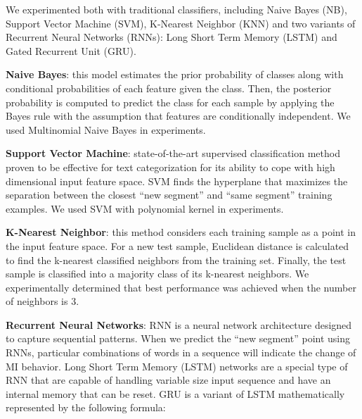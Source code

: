 \documentclass{amia}
\begin{document}
We experimented both with traditional classifiers, including Naive Bayes (NB)\cite{pedregosa2011scikit}, Support Vector Machine (SVM)\cite{chang2011libsvm}, K-Nearest Neighbor (KNN)\cite{pedregosa2011scikit} and two variants of Recurrent Neural Networks (RNNs)\cite{bengio1993problem}: Long Short Term Memory (LSTM)\cite{hochreiter1997long} and Gated Recurrent Unit (GRU)\cite{cho2014properties}. 

\textbf{Naive Bayes}: this model estimates the prior probability of classes along with conditional probabilities of each feature given the class. Then, the posterior probability is computed to predict the class for each sample by applying the Bayes rule with the assumption that features are conditionally independent. We used Multinomial Naive Bayes in experiments.

\textbf{Support Vector Machine}: state-of-the-art supervised classification method proven to be effective for text categorization\cite{joachims1998text} for its ability to cope with high dimensional input feature space. SVM finds the hyperplane that maximizes the separation between the closest ``new segment'' and ``same segment'' training examples. We used SVM with polynomial kernel in experiments.   

\textbf{K-Nearest Neighbor}: this method considers each training sample as a point in the input feature space. For a new test sample, Euclidean distance is calculated to find the k-nearest classified neighbors from the training set. Finally, the test sample is classified into a majority class of its k-nearest neighbors. We experimentally determined that best performance was achieved when the number of neighbors is 3. 

\textbf{Recurrent Neural Networks}: RNN is a neural network architecture designed to capture sequential patterns. When we predict the ``new segment'' point using RNNs, particular combinations of words in a sequence will indicate the change of MI behavior. Long Short Term Memory (LSTM) networks\cite{hochreiter1997long} are a special type of RNN that are capable of handling variable size input sequence and have an internal memory that can be reset. GRU\cite{cho2014properties} is a variant of LSTM mathematically represented by the following formula:
\end{document}
